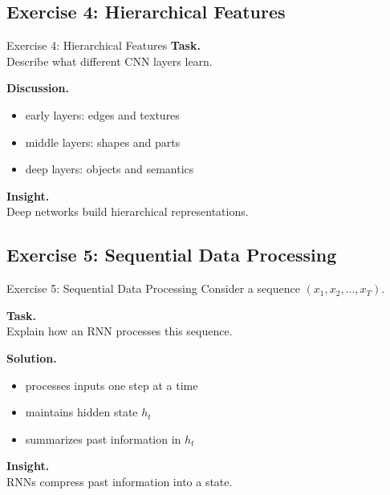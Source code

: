 \documentclass[aspectratio=169,11pt]{beamer}
\begin{document}
\subsection{Exercise 4: Hierarchical Features}
\begin{frame}[t,allowframebreaks]{Exercise 4: Hierarchical Features}
\small
\textbf{Task.}\\ Describe what different CNN layers learn.

\textbf{Discussion.}\\ \begin{itemize}
    \item early layers: edges and textures
    \item middle layers: shapes and parts
    \item deep layers: objects and semantics
\end{itemize}

\textbf{Insight.}\\ Deep networks build hierarchical representations.
\end{frame}

\subsection{Exercise 5: Sequential Data Processing}
\begin{frame}[t,allowframebreaks]{Exercise 5: Sequential Data Processing}
\small
Consider a sequence $(x_1, x_2, \dots, x_T)$.

\textbf{Task.}\\ Explain how an RNN processes this sequence.

\textbf{Solution.}\\ \begin{itemize}
    \item processes inputs one step at a time
    \item maintains hidden state $h_t$
    \item summarizes past information in $h_t$
\end{itemize}

\textbf{Insight.}\\ RNNs compress past information into a state.
\end{frame}
\end{document}
